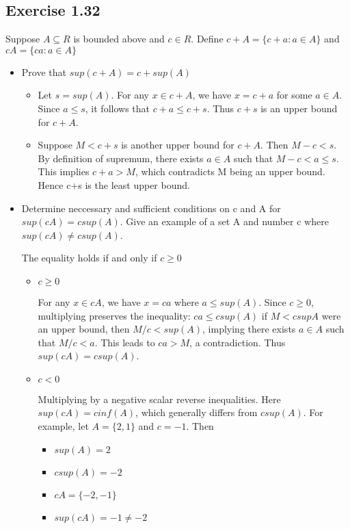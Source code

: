 \documentclass[12pt]{article}
\begin{document}
		\subsection*{Exercise 1.32}
			Suppose $A \subseteq R$ is bounded above and $c \in R$. Define $c + A = \{c+a: a \in A\}$ and $cA = \{ca: a \in A\}$
			\begin{itemize}
				\item Prove that $sup(c+A) = c + sup(A)$
				
					\begin{itemize}
						\item Let $s = sup(A)$. For any $x \in c + A$, we have $x = c + a$ for some $a \in A$. Since $a \le s$, it follows that $c+a \le c + s$. Thus $c + s$ is an upper bound for $c + A$.
						\item Suppose $M < c+s$ is another upper bound for $c + A$. Then $M-c < s$. By definition of supremum, there exists $a \in A$ such that $M-c < a \le s$. This implies $c + a > M$, which contradicts M being an upper bound. Hence c+s is the least upper bound.
					\end{itemize}
				\item Determine neccessary and sufficient conditions on c and A for $sup(cA) = c sup(A)$. Give an example of a set A and number c where $sup(cA) \ne c sup(A)$.
				
					The equality holds if and only if $c \ge 0$
					\begin{itemize}
						\item $c \ge 0$
						
						For any $x \in cA$, we have $x = ca$ where $a \le sup(A)$. Since $c \ge 0$, multiplying preserves the inequality: $ca \le c sup(A)$ if $M < c sup A$ were an upper bound, then $M/c < sup(A)$, implying there exists $a \in A$ such that $M/c < a$. This leads to $ca > M$, a contradiction. Thus $sup(cA) = c sup(A)$.
						\item $c < 0$
						
						Multiplying by a negative scalar reverse inequalities. Here $sup(cA) = c inf(A)$, which generally differs from $c sup(A)$. For example, let $A = \{2,1\}$ and $c = -1$. Then
						\begin{itemize}
							\item $sup(A) = 2$
							\item $c sup(A) = -2$
							\item $cA = \{-2, -1\}$
							\item $sup(cA) = -1 \ne -2$
						\end{itemize}
					\end{itemize}
			\end{itemize}
\end{document}
